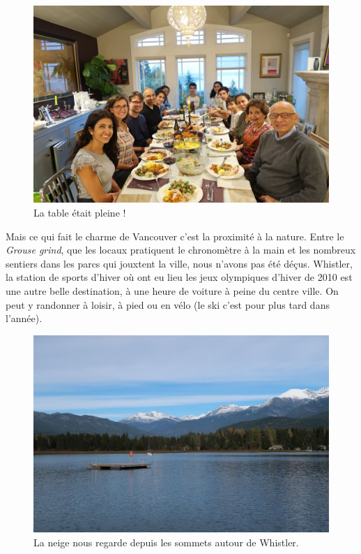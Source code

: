 \begin{figure}
\centering
\includegraphics{images/20181016_thanksgiving.JPG}
\caption{La table était pleine !}
\end{figure}

Mais ce qui fait le charme de Vancouver c'est la proximité à la nature.
Entre le \emph{Grouse grind}, que les locaux pratiquent le chronomètre à
la main et les nombreux sentiers dans les parcs qui jouxtent la ville,
nous n'avons pas été déçus. Whistler, la station de sports d'hiver où
ont eu lieu les jeux olympiques d'hiver de 2010 est une autre belle
destination, à une heure de voiture à peine du centre ville. On peut y
randonner à loisir, à pied ou en vélo (le ski c'est pour plus tard dans
l'année).

\begin{figure}
\centering
\includegraphics{images/20181016_whistler.JPG}
\caption{La neige nous regarde depuis les sommets autour de Whistler.}
\end{figure}

